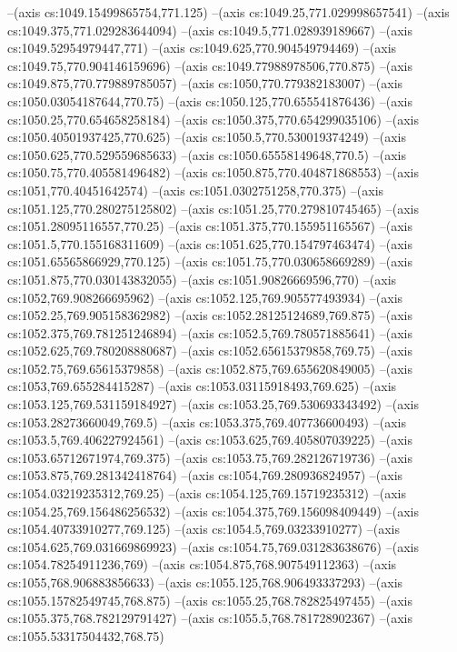 --(axis cs:1049.15499865754,771.125)
--(axis cs:1049.25,771.029998657541)
--(axis cs:1049.375,771.029283644094)
--(axis cs:1049.5,771.028939189667)
--(axis cs:1049.52954979447,771)
--(axis cs:1049.625,770.904549794469)
--(axis cs:1049.75,770.904146159696)
--(axis cs:1049.77988978506,770.875)
--(axis cs:1049.875,770.779889785057)
--(axis cs:1050,770.779382183007)
--(axis cs:1050.03054187644,770.75)
--(axis cs:1050.125,770.655541876436)
--(axis cs:1050.25,770.654658258184)
--(axis cs:1050.375,770.654299035106)
--(axis cs:1050.40501937425,770.625)
--(axis cs:1050.5,770.530019374249)
--(axis cs:1050.625,770.529559685633)
--(axis cs:1050.65558149648,770.5)
--(axis cs:1050.75,770.405581496482)
--(axis cs:1050.875,770.404871868553)
--(axis cs:1051,770.40451642574)
--(axis cs:1051.0302751258,770.375)
--(axis cs:1051.125,770.280275125802)
--(axis cs:1051.25,770.279810745465)
--(axis cs:1051.28095116557,770.25)
--(axis cs:1051.375,770.155951165567)
--(axis cs:1051.5,770.155168311609)
--(axis cs:1051.625,770.154797463474)
--(axis cs:1051.65565866929,770.125)
--(axis cs:1051.75,770.030658669289)
--(axis cs:1051.875,770.030143832055)
--(axis cs:1051.90826669596,770)
--(axis cs:1052,769.908266695962)
--(axis cs:1052.125,769.905577493934)
--(axis cs:1052.25,769.905158362982)
--(axis cs:1052.28125124689,769.875)
--(axis cs:1052.375,769.781251246894)
--(axis cs:1052.5,769.780571885641)
--(axis cs:1052.625,769.780208880687)
--(axis cs:1052.65615379858,769.75)
--(axis cs:1052.75,769.65615379858)
--(axis cs:1052.875,769.655620849005)
--(axis cs:1053,769.655284415287)
--(axis cs:1053.03115918493,769.625)
--(axis cs:1053.125,769.531159184927)
--(axis cs:1053.25,769.530693343492)
--(axis cs:1053.28273660049,769.5)
--(axis cs:1053.375,769.407736600493)
--(axis cs:1053.5,769.406227924561)
--(axis cs:1053.625,769.405807039225)
--(axis cs:1053.65712671974,769.375)
--(axis cs:1053.75,769.282126719736)
--(axis cs:1053.875,769.281342418764)
--(axis cs:1054,769.280936824957)
--(axis cs:1054.03219235312,769.25)
--(axis cs:1054.125,769.15719235312)
--(axis cs:1054.25,769.156486256532)
--(axis cs:1054.375,769.156098409449)
--(axis cs:1054.40733910277,769.125)
--(axis cs:1054.5,769.03233910277)
--(axis cs:1054.625,769.031669869923)
--(axis cs:1054.75,769.031283638676)
--(axis cs:1054.78254911236,769)
--(axis cs:1054.875,768.907549112363)
--(axis cs:1055,768.906883856633)
--(axis cs:1055.125,768.906493337293)
--(axis cs:1055.15782549745,768.875)
--(axis cs:1055.25,768.782825497455)
--(axis cs:1055.375,768.782129791427)
--(axis cs:1055.5,768.781728902367)
--(axis cs:1055.53317504432,768.75)
